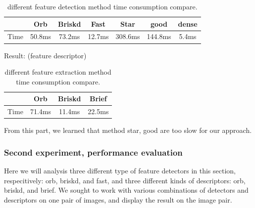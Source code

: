 \documentclass[10pt,conference,compsocconf]{IEEEtran}
\begin{document}
\begin{table}[!ht]
  \centering
  \begin{tabular}{|c|c|c|c|c|c|c|}
    \hline
     & Orb&Briskd&Fast&Star&good&dense\\
    \hline
    Time&50.8ms&73.2ms&12.7ms&308.6ms&144.8ms&5.4ms \\
    \hline
  \end{tabular}
  \caption{different feature detection method time consumption compare.}
\end{table}
 
Result: (feature descriptor)\\

\begin{table}[!ht]
  \centering
  \begin{tabular}{|c|c|c|c|}
    \hline
     & Orb&Briskd&Brief\\
    \hline
    Time&71.4ms&11.4ms&22.5ms \\
    \hline
  \end{tabular}
  \caption{different feature extraction method time consumption compare.}
\end{table}

From this part, we learned that method star, good are too slow for our approach.\\

\subsubsection{Second experiment, performance evaluation}

Here we will analysis three different type of feature detectors in this section, respecitively: orb, briskd, and fast, and three different kinds of descriptors: orb, briskd, and brief. We sought to work with various combinations of detectors and descriptors on one pair of images, and display the result on the image pair. \\
\end{document}
